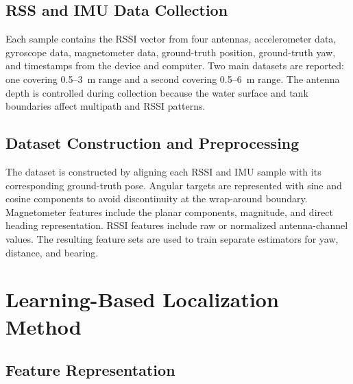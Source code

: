 \documentclass{uhcoethesis}
\begin{document}
\subsection{RSS and IMU Data Collection}

Each sample contains the RSSI vector from four antennas, accelerometer data, gyroscope data, magnetometer data, ground-truth position, ground-truth yaw, and timestamps from the device and computer. Two main datasets are reported: one covering 0.5--3~m range and a second covering 0.5--6~m range. The antenna depth is controlled during collection because the water surface and tank boundaries affect multipath and RSSI patterns.

\subsection{Dataset Construction and Preprocessing}

The dataset is constructed by aligning each RSSI and IMU sample with its corresponding ground-truth pose. Angular targets are represented with sine and cosine components to avoid discontinuity at the wrap-around boundary. Magnetometer features include the planar components, magnitude, and direct heading representation. RSSI features include raw or normalized antenna-channel values. The resulting feature sets are used to train separate estimators for yaw, distance, and bearing.

\section{Learning-Based Localization Method}

\subsection{Feature Representation}
\end{document}
